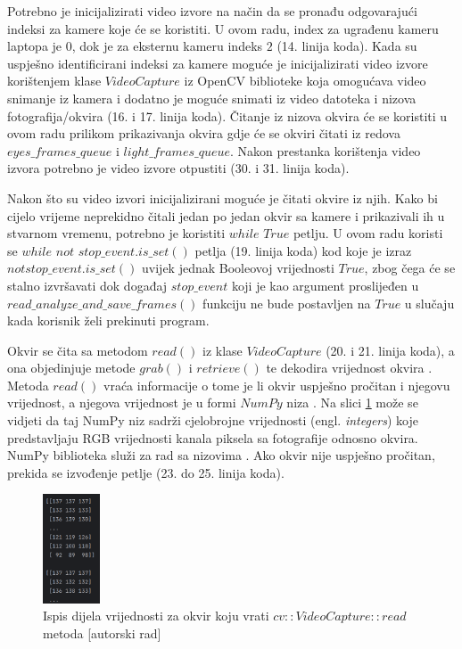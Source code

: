 \documentclass{foi}
\begin{document}
Potrebno je inicijalizirati video izvore na način da se pronađu odgovarajući indeksi za kamere koje će se koristiti. U ovom radu, index za ugrađenu kameru laptopa je $0$, dok je za eksternu kameru indeks $2$ (14. linija koda). Kada su uspješno identificirani indeksi za kamere moguće je inicijalizirati video izvore korištenjem klase $VideoCapture$ iz OpenCV biblioteke koja omogućava video snimanje iz kamera i dodatno je moguće snimati iz video datoteka i nizova fotografija/okvira \cite{OpenCV2} (16. i 17. linija koda). Čitanje iz nizova okvira će se koristiti u ovom radu prilikom prikazivanja okvira gdje će se okviri čitati iz redova $eyes\_frames\_queue$ i $light\_frames\_queue$. Nakon prestanka korištenja video izvora potrebno je video izvore otpustiti (30. i 31. linija koda).

Nakon što su video izvori  inicijalizirani moguće je čitati okvire iz njih. Kako bi cijelo vrijeme neprekidno čitali jedan po jedan okvir sa kamere i prikazivali ih u stvarnom vremenu, potrebno je koristiti $while$ $True$ petlju. U ovom radu koristi se $while$ $not$ $stop\_event.is\_set()$ petlja (19. linija koda) kod koje je izraz $not stop\_event.is\_set()$ uvijek jednak Booleovoj vrijednosti $True$, zbog čega će se stalno izvršavati dok događaj $stop\_event$ koji je kao argument proslijeđen u $read\_analyze\_and\_save\_frames()$ funkciju ne bude postavljen na $True$ u slučaju kada korisnik želi prekinuti program.

Okvir se čita sa metodom $read()$ iz klase $VideoCapture$ (20. i 21. linija koda), a ona objedinjuje metode $grab()$ i $retrieve()$ te dekodira vrijednost okvira \cite{OpenCV2}. Metoda $read()$ vraća informacije o tome je li okvir uspješno pročitan i njegovu vrijednost, a njegova vrijednost je u formi $NumPy$ niza \cite{Reshma2023}. Na slici \ref{fig:ispis_okvira} može se vidjeti da taj NumPy niz sadrži cjelobrojne vrijednosti (engl. \emph{integers}) koje predstavljaju RGB vrijednosti kanala piksela sa fotografije odnosno okvira. NumPy biblioteka služi za rad sa nizovima \cite{NumPy}. Ako okvir nije uspješno pročitan, prekida se izvođenje petlje (23. do 25. linija koda).

\begin{figure}[h!]
    \centering
    \includegraphics[width=0.15\textwidth]{slike/numpy_frame}
    \caption{Ispis dijela vrijednosti za okvir koju vrati $cv::VideoCapture::read$ metoda [autorski rad]}
    \label{fig:ispis_okvira}
\end{figure}
\end{document}
